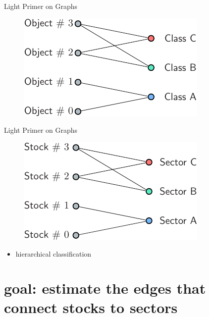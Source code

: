 \documentclass[aspectratio=169]{beamer}
\begin{document}
\begin{frame}{Light Primer on Graphs}
    \pause
  \vspace{1cm}
  \begin{figure}
       \includegraphics[scale=1.5]{figures/k-comp-bipartite-crop.pdf}
  \end{figure}
\end{frame}
\begin{frame}{Light Primer on Graphs}
  \vspace{1cm}
  \begin{figure}
       \includegraphics[scale=1.5]{figures/k-comp-bipartite-crop-finance.pdf}
  \end{figure}
  \pause
  \begin{itemize}
    \item hierarchical classification
  \end{itemize}
\end{frame}
\section*{goal: estimate the edges that connect stocks to sectors}
\end{document}
